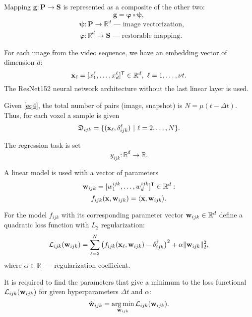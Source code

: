 \documentclass{article}
\begin{document}
Mapping $\mathbf{g}: \mathbf{P} \to \mathbf{S}$ is represented as a composite of the other two:
\[ \mathbf{g} = \bm{\varphi} \circ \bm{\psi}, \]
\vspace{-0.5cm}
\begin{align*}
	 & \bm{\psi}: \mathbf{P} \to \mathbb{R}^d
	\text{~--- image vectorization,}        \\
	 & \bm{\varphi}: \mathbb{R}^d \to \mathbf{S}
	\text{~--- restorable mapping.}
\end{align*}

For each image from the video sequence, we have an embedding vector of dimension $d$:
\[ \mathbf{x}_{\ell} = [x^{\ell}_1, \ldots, x^{\ell}_{d}]^{\mathsf{T}} \in \mathbb{R}^{d}, \ {\ell} = 1, \ldots, \nu t. \]
The ResNet152 neural network architecture without the last linear layer is used.

Given \eqref{eq4}, the total number of pairs (image, snapshot)
is $N = \mu (t - \Delta t)$. Thus, for each voxel a sample is given
\[ \mathfrak{D}_{ijk} = \{(\mathbf{x}_{\ell}, \delta^{\ell}_{ijk}) \ | \ {\ell} = 2, \ldots, N \}. \]

The regression task is set
\begin{equation}
	\label{eq6}
	y_{ijk}: \mathbb{R}^{d} \to \mathbb{R}.
\end{equation}

A linear model is used with a vector of parameters
\[ \mathbf{w}_{ijk} = [w^{ijk}_1, \ldots, w^{ijk}_{d}]^{\mathsf{T}} \in \mathbb{R}^{d}: \]
\begin{equation}
	\label{eq7}
	f_{ijk}(\mathbf{x}, \mathbf{w}_{ijk}) = \langle \mathbf{x}, \mathbf{w}_{ijk} \rangle.
\end{equation}

For the model $f_{ijk}$ with its corresponding parameter vector $\mathbf{w}_{ijk} \in \mathbb{R}^{d}$
define a quadratic loss function with $L_2$ regularization:
\begin{equation}
	\label{eq8}
	\mathcal{L}_{ijk}(\mathbf{w}_{ijk}) = \sum\limits_{\ell = 2}^{N} \big(f_{ijk}(\mathbf{x}_{\ell}, \mathbf{w}_{ijk}) - \delta^{\ell}_{ijk}\big)^2 + \alpha \| \mathbf{w}_{ijk} \|_2^2,
\end{equation}
where $\alpha \in \mathbb{R}$~--- regularization coefficient.

It is required to find the parameters that give a minimum to the loss functional $\mathcal{L}_{ijk}(\mathbf{w}_{ijk})$
for given hyperparameters $\Delta t$ and $\alpha$:
\begin{equation}
	\label{eq9}
	\hat{\mathbf{w}}_{ijk} = \operatorname*{arg\,min}_{\mathbf{w}_{ijk}} \mathcal{L}_{ijk}(\mathbf{w}_{ijk}).
\end{equation}
\end{document}
